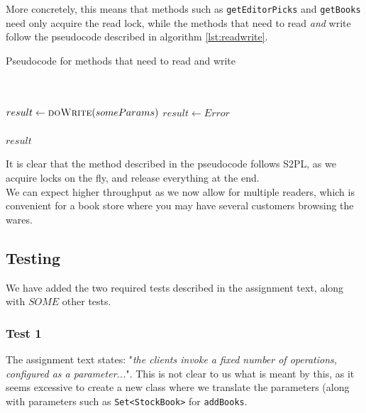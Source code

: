 \documentclass[11pt]{article}
\begin{document}
More concretely, this means that methods such as \texttt{getEditorPicks} and
\texttt{getBooks} need only acquire the read lock, while the methods that
need to read \emph{and} write follow the pseudocode described in algorithm
\ref{lst:readwrite}.\\

\begin{algorithm}
\caption{Pseudocode for methods that need to read and write}
\label{lst:readwrite}
\begin{algorithmic}
\\
\hspace{0.58cm}
\\
\hspace{1.16cm}
    \State $result\gets \Call{doWrite}{someParams}$
\Else
    \State $result\gets Error$
\EndIf\\
\hspace{0.58cm}\\
\hspace{0.58cm}\Return $result$
\EndFunction
\end{algorithmic}
\end{algorithm}

It is clear that the method described in the pseudocode follows S2PL, as
we acquire locks on the fly, and release everything at the end.\\

We can expect higher throughput as we now allow for multiple readers, which
is convenient for a book store where you may have several customers browsing
the wares.

\subsection*{Testing}

We have added the two required tests described in the assignment text, along
with $SOME$ other tests.

\subsubsection*{Test 1}

The assignment text states: "\emph{the clients invoke a fixed number of operations,
configured as a parameter...}". This is not clear to us what is meant by this, as
it seems excessive to create a new class where we translate the parameters (along with
parameters such as \texttt{Set<StockBook>} for \texttt{addBooks}.
\end{document}
